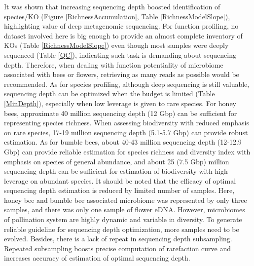 \documentclass[11pt]{article}
\begin{document}
It was shown that increasing sequencing depth boosted identification of species/KO (Figure \ref{RichnessAccumulation}, Table \ref{RichnessModelSlope}), highlighting value of deep metagenomic sequencing. 
For function profiling, no dataset involved here is big enough to provide an almost complete inventory of KOs (Table \ref{RichnessModelSlope}) even though most samples were deeply sequenced (Table \ref{QC}), indicating such task is demanding about sequencing depth. 
Therefore, when dealing with function potentiality of microbiome associated with bees or flowers, retrieving as many reads as possible would be recommended. 
As for species profiling, although deep sequencing is still valuable, sequencing depth can be optimized when the budget is limited (Table \ref{MinDepth}), especially when low leverage is given to rare species. 
For honey bees, approximate 40 million sequencing depth (12 Gbp) can be sufficient for representing species richness. 
When assessing biodiversity with reduced emphasis on rare species, 17-19 million sequencing depth (5.1-5.7 Gbp) can provide robust estimation. 
As for bumble bees, about 40-43 million sequencing depth (12-12.9 Gbp) can provide reliable estimation for species richness and diversity index with emphasis on species of general abundance, and about 25 (7.5 Gbp) million sequencing depth can be sufficient for estimation of biodiversity with high leverage on abundant species. 
It should be noted that the efficacy of optimal sequencing depth estimation is reduced by limited number of samples. 
Here, honey bee and bumble bee associated microbiome was represented by only three samples, and there was only one sample of flower eDNA. 
However, microbiomes of pollination system are highly dynamic and variable in diversity. 
To generate reliable guideline for sequencing depth optimization, more samples need to be evolved. 
Besides, there is a lack of repeat in sequencing depth subsampling. 
Repeated subsampling boosts precise computation of rarefaction curve and increases accuracy of estimation of optimal sequencing depth. 
\end{document}
